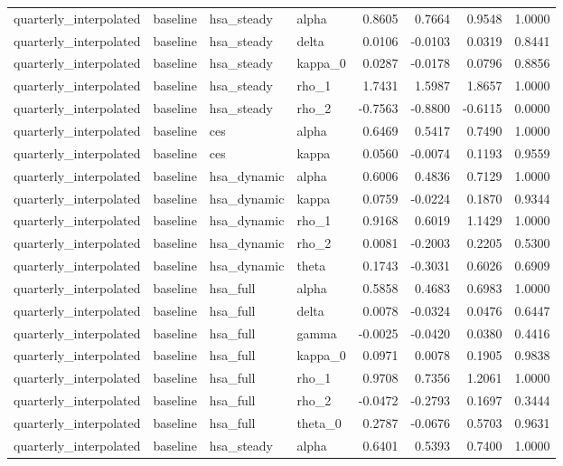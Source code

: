 \begin{tabular}{llllrrrr}
quarterly\_interpolated & baseline & hsa\_steady & alpha & 0.8605 & 0.7664 & 0.9548 & 1.0000 \\
quarterly\_interpolated & baseline & hsa\_steady & delta & 0.0106 & -0.0103 & 0.0319 & 0.8441 \\
quarterly\_interpolated & baseline & hsa\_steady & kappa\_0 & 0.0287 & -0.0178 & 0.0796 & 0.8856 \\
quarterly\_interpolated & baseline & hsa\_steady & rho\_1 & 1.7431 & 1.5987 & 1.8657 & 1.0000 \\
quarterly\_interpolated & baseline & hsa\_steady & rho\_2 & -0.7563 & -0.8800 & -0.6115 & 0.0000 \\
quarterly\_interpolated & baseline & ces & alpha & 0.6469 & 0.5417 & 0.7490 & 1.0000 \\
quarterly\_interpolated & baseline & ces & kappa & 0.0560 & -0.0074 & 0.1193 & 0.9559 \\
quarterly\_interpolated & baseline & hsa\_dynamic & alpha & 0.6006 & 0.4836 & 0.7129 & 1.0000 \\
quarterly\_interpolated & baseline & hsa\_dynamic & kappa & 0.0759 & -0.0224 & 0.1870 & 0.9344 \\
quarterly\_interpolated & baseline & hsa\_dynamic & rho\_1 & 0.9168 & 0.6019 & 1.1429 & 1.0000 \\
quarterly\_interpolated & baseline & hsa\_dynamic & rho\_2 & 0.0081 & -0.2003 & 0.2205 & 0.5300 \\
quarterly\_interpolated & baseline & hsa\_dynamic & theta & 0.1743 & -0.3031 & 0.6026 & 0.6909 \\
quarterly\_interpolated & baseline & hsa\_full & alpha & 0.5858 & 0.4683 & 0.6983 & 1.0000 \\
quarterly\_interpolated & baseline & hsa\_full & delta & 0.0078 & -0.0324 & 0.0476 & 0.6447 \\
quarterly\_interpolated & baseline & hsa\_full & gamma & -0.0025 & -0.0420 & 0.0380 & 0.4416 \\
quarterly\_interpolated & baseline & hsa\_full & kappa\_0 & 0.0971 & 0.0078 & 0.1905 & 0.9838 \\
quarterly\_interpolated & baseline & hsa\_full & rho\_1 & 0.9708 & 0.7356 & 1.2061 & 1.0000 \\
quarterly\_interpolated & baseline & hsa\_full & rho\_2 & -0.0472 & -0.2793 & 0.1697 & 0.3444 \\
quarterly\_interpolated & baseline & hsa\_full & theta\_0 & 0.2787 & -0.0676 & 0.5703 & 0.9631 \\
quarterly\_interpolated & baseline & hsa\_steady & alpha & 0.6401 & 0.5393 & 0.7400 & 1.0000 \\

\end{tabular}
